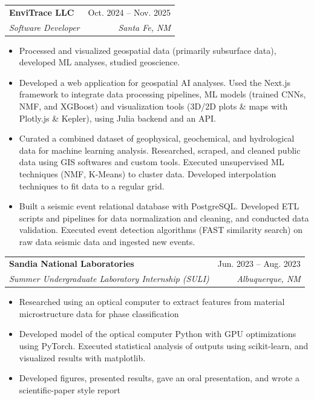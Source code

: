 \documentclass[letterpaper,11pt]{article}
\makeatletter
\newcommand{\resumeItem}[1]{
  \item\small{
    {#1 \vspace{-2pt}}
  }
}
\newcommand{\resumeSubheading}[4]{
  \vspace{-2pt}\item
    \begin{tabular*}{0.97\textwidth}[t]{l@{\extracolsep{\fill}}r}
      \textbf{#1} & #2 \\
      \textit{\small#3} & \textit{\small #4} \\
    \end{tabular*}\vspace{-7pt}
}
\newcommand{\resumeSubSubheading}[2]{
    \item
    \begin{tabular*}{0.97\textwidth}{l@{\extracolsep{\fill}}r}
      \textit{\small#1} & \textit{\small #2} \\
    \end{tabular*}\vspace{-7pt}
}
\newcommand{\resumeSubHeadingListEnd}{\end{itemize}}
\newcommand{\resumeItemListStart}{\begin{itemize}}
\newcommand{\resumeItemListEnd}{\end{itemize}\vspace{-5pt}}
\makeatother
\begin{document}
    \resumeSubheading
      {EnviTrace LLC}{Oct. 2024 -- Nov. 2025}
      {Software Developer}{Santa Fe, NM}
      \resumeItemListStart
        \resumeItem{Processed and visualized geospatial data (primarily subsurface data), developed ML analyses, studied geoscience.}
        \resumeItem{Developed a web application for geospatial AI analyses. Used the Next.js framework to integrate data processing pipelines, ML models (trained CNNs, NMF, and XGBoost)  and visualization tools (3D/2D plots \& maps with Plotly.js \& Kepler), using Julia backend and an API.}
        \resumeItem{Curated a combined dataset of geophysical, geochemical, and hydrological data for machine learning analysis. Researched, scraped, and cleaned public data using GIS softwares and custom tools. Executed unsupervised ML techniques (NMF, K-Means) to cluster data. Developed interpolation techniques to fit data to a regular grid.}
        \resumeItem{Built a seismic event relational database with PostgreSQL. Developed ETL scripts and pipelines for data normalization and cleaning, and conducted data validation. Executed event detection algorithms (FAST similarity search) on raw data seismic data and ingested new events.}
      \resumeItemListEnd

      

    \resumeSubheading
      {Sandia National Laboratories}{Jun. 2023 -- Aug. 2023}
      {Summer Undergraduate Laboratory Internship (SULI)}{Albuquerque, NM}
      \resumeItemListStart
        \resumeItem{Researched using an optical computer to extract features from material microstructure data for phase classification}
        \resumeItem{Developed model of the optical computer Python with GPU optimizations using PyTorch. Executed statistical analysis of outputs using scikit-learn, and visualized results with matplotlib. }%
        \resumeItem{Developed figures, presented results, gave an oral presentation, and wrote a scientific-paper style report}
    \resumeItemListEnd
\end{document}

